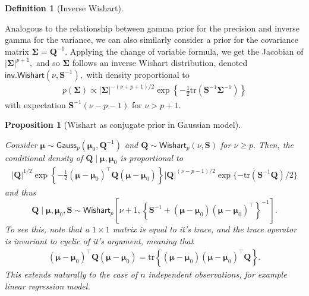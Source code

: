 \documentclass[
  11pt,
  letterpaper,
]{scrbook}
\theoremstyle{definition}
\theoremstyle{plain}
\newtheorem{proposition}{Proposition}[chapter]
\theoremstyle{plain}
\theoremstyle{plain}
\theoremstyle{definition}
\theoremstyle{definition}
\newtheorem{definition}{Definition}[chapter]
\theoremstyle{plain}
\newtheorem{proposition}{Proposition}[chapter]
\theoremstyle{plain}
\theoremstyle{remark}
\begin{document}
\begin{definition}[Inverse
Wishart]\protect\hypertarget{def-inverse-wishart}{}\label{def-inverse-wishart}

Analogous to the relationship between gamma prior for the precision and
inverse gamma for the variance, we can also similarly consider a prior
for the covariance matrix \(\boldsymbol{\Sigma} = \boldsymbol{Q}^{-1}.\)
Applying the change of variable formula, we get the Jacobian of
\(|\boldsymbol{\Sigma}|^{p+1},\) and so \(\boldsymbol{\Sigma}\) follows
an inverse Wishart distribution, denoted
\(\mathsf{inv. Wishart}(\nu, \mathbf{S}^{-1}),\) with density
proportional to \begin{align*}
 p(\boldsymbol{\Sigma}) \propto |\boldsymbol{\Sigma}|^{-(\nu+p+1)/2} \exp\left\{-\frac{1}{2} \mathrm{tr}\left(\mathbf{S}^{-1}\boldsymbol{\Sigma}^{-1}\right)\right\}
\end{align*} with expectation \(\mathbf{S}^{-1}(\nu-p-1)\) for
\(\nu > p+1.\)

\end{definition}

\begin{proposition}[Wishart as conjugate prior in Gaussian
model]\protect\hypertarget{prp-conjugate-prior}{}\label{prp-conjugate-prior}

Consider
\(\boldsymbol{\mu} \sim \mathsf{Gauss}_p(\boldsymbol{\mu}_0, \boldsymbol{Q}^{-1})\)
and \(\boldsymbol{Q} \sim \mathsf{Wishart}_p(\nu, \mathbf{S})\) for
\(\nu \geq p.\) Then, the conditional density of
\(\boldsymbol{Q} \mid \boldsymbol{\mu}, \boldsymbol{\mu}_0\) is
proportional to \begin{align*}
 |\boldsymbol{Q}|^{1/2} \exp \left\{ -\frac{1}{2} (\boldsymbol{\mu}-\boldsymbol{\mu}_0)^\top\boldsymbol{Q}(\boldsymbol{\mu}-\boldsymbol{\mu}_0)\right\} |\boldsymbol{Q}|^{(\nu-p-1)/2}\exp\{-\mathrm{tr}(\mathbf{S}^{-1}\boldsymbol{Q})/2\}
\end{align*} and thus
\[\boldsymbol{Q} \mid \boldsymbol{\mu}, \boldsymbol{\mu}_0, \mathbf{S} \sim \mathsf{Wishart}_p\left[\nu + 1, \left\{\mathbf{S}^{-1} + (\boldsymbol{\mu}-\boldsymbol{\mu}_0)(\boldsymbol{\mu}-\boldsymbol{\mu}_0)^\top\right\}^{-1}\right].\]
To see this, note that a \(1 \times 1\) matrix is equal to it's trace,
and the trace operator is invariant to cyclic of it's argument, meaning
that \begin{align*}
 (\boldsymbol{\mu}-\boldsymbol{\mu}_0)^\top\boldsymbol{Q}(\boldsymbol{\mu}-\boldsymbol{\mu}_0) = \mathrm{tr}\left\{ (\boldsymbol{\mu}-\boldsymbol{\mu}_0)(\boldsymbol{\mu}-\boldsymbol{\mu}_0)^\top\boldsymbol{Q}\right\}.
\end{align*} This extends naturally to the case of \(n\) independent
observations, for example linear regression model.

\end{proposition}
\end{document}
